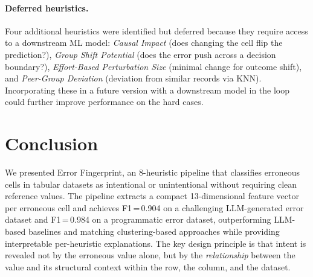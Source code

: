 \documentclass[11pt,a4paper]{article}
\begin{document}
\paragraph{Deferred heuristics.}

Four additional heuristics were identified but deferred because they require
access to a downstream ML model:
\emph{Causal Impact} (does changing the cell flip the prediction?),
\emph{Group Shift Potential} (does the error push across a decision boundary?),
\emph{Effort-Based Perturbation Size} (minimal change for outcome shift), and
\emph{Peer-Group Deviation} (deviation from similar records via KNN).
Incorporating these in a future version with a downstream model in the loop
could further improve performance on the hard cases.

\section{Conclusion}
\label{sec:conclusion}

We presented Error Fingerprint, an 8-heuristic pipeline that classifies
erroneous cells in tabular datasets as intentional or unintentional without
requiring clean reference values.  The pipeline extracts a compact
13-dimensional feature vector per erroneous cell and achieves
F1\,=\,0.904 on a challenging LLM-generated error dataset and F1\,=\,0.984
on a programmatic error dataset, outperforming LLM-based baselines and
matching clustering-based approaches while providing interpretable
per-heuristic explanations.  The key design principle is that intent is
revealed not by the erroneous value alone, but by the \emph{relationship}
between the value and its structural context within the row, the column,
and the dataset.

\end{document}
